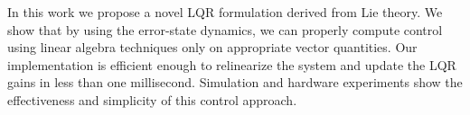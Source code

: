 

In this work we propose a novel LQR formulation derived from Lie theory. We
show that by using the error-state dynamics, we can properly compute control
using linear algebra techniques only on appropriate vector quantities. Our implementation is
efficient enough to relinearize the system and update the LQR gains in less than
one millisecond. Simulation and hardware experiments show the effectiveness and
simplicity of this control approach. 

